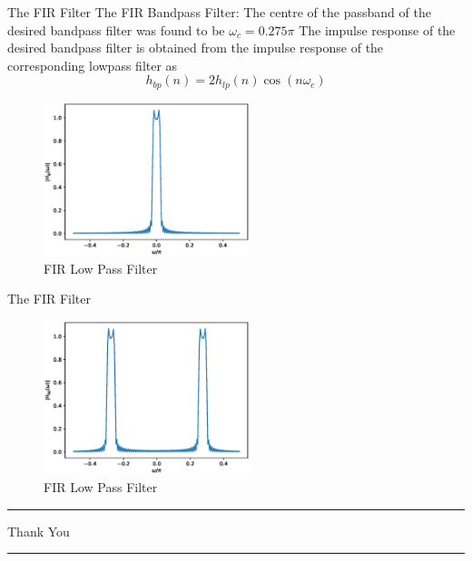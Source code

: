 \documentclass{beamer}
\begin{document}
\begin{frame}{The FIR Filter}
The FIR Bandpass Filter:
The centre of the passband of the desired bandpass filter was found to be $\omega_{c}=0.275 \pi$ The impulse response of the desired bandpass filter is obtained from the
impulse response of the corresponding lowpass filter as
$$
h_{b p}(n)=2 h_{l p}(n) \cos \left(n \omega_{c}\right)
$$

\begin{figure}
    \centering
    \includegraphics[width=6cm]{figs/FIR_lowpass.eps}
    \caption{FIR Low Pass Filter}
\end{figure}
\end{frame}

\begin{frame}{The FIR Filter}

\begin{figure}
    \centering
    \includegraphics[width=6cm]{figs/FIR_bandpass.eps}
    \caption{FIR Low Pass Filter}
\end{figure}

\noindent
{ \rule{\linewidth}{0.5mm} }
\Huge{\centerline{Thank You}}
\noindent
{ \rule{\linewidth}{0.5mm} }
\end{frame}
\end{document}
